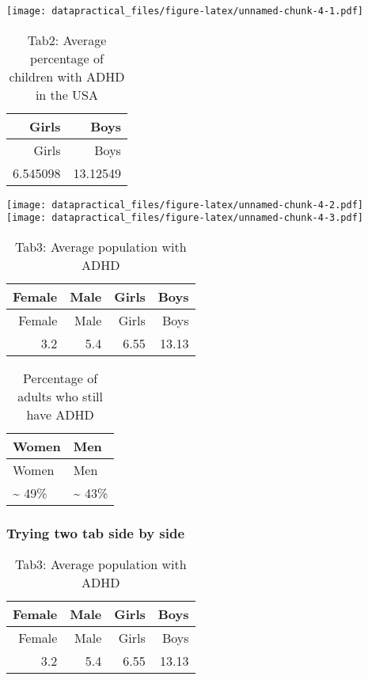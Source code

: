 \documentclass[
]{article}
\begin{document}
\texttt{[image: datapractical\_files/figure-latex/unnamed-chunk-4-1.pdf]}

\begin{longtable}[]{@{}rr@{}}
\caption{Tab2: Average percentage of children with ADHD in the
USA}\tabularnewline
\toprule()
Girls & Boys \\
\midrule()
\endfirsthead
\toprule()
Girls & Boys \\
\midrule()
\endhead
6.545098 & 13.12549 \\
\bottomrule()
\end{longtable}

\texttt{[image: datapractical\_files/figure-latex/unnamed-chunk-4-2.pdf]}
\texttt{[image: datapractical\_files/figure-latex/unnamed-chunk-4-3.pdf]}

\begin{longtable}[]{@{}rrrr@{}}
\caption{Tab3: Average population with ADHD}\tabularnewline
\toprule()
Female & Male & Girls & Boys \\
\midrule()
\endfirsthead
\toprule()
Female & Male & Girls & Boys \\
\midrule()
\endhead
3.2 & 5.4 & 6.55 & 13.13 \\
\bottomrule()
\end{longtable}

\begin{longtable}[]{@{}ll@{}}
\caption{Percentage of adults who still have ADHD}\tabularnewline
\toprule()
Women & Men \\
\midrule()
\endfirsthead
\toprule()
Women & Men \\
\midrule()
\endhead
\textasciitilde{} 49\% & \textasciitilde{} 43\% \\
\bottomrule()
\end{longtable}

\hypertarget{trying-two-tab-side-by-side}{%
\subsubsection{Trying two tab side by
side}\label{trying-two-tab-side-by-side}}

\begin{longtable}[]{@{}rrrr@{}}
\caption{Tab3: Average population with ADHD}\tabularnewline
\toprule()
Female & Male & Girls & Boys \\
\midrule()
\endfirsthead
\toprule()
Female & Male & Girls & Boys \\
\midrule()
\endhead
3.2 & 5.4 & 6.55 & 13.13 \\
\bottomrule()
\end{longtable}
\end{document}
